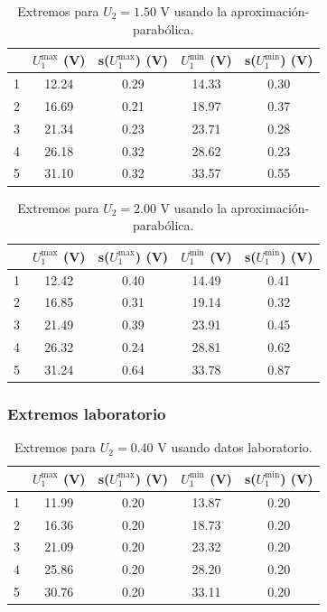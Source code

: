 \documentclass[12pt,a4paper]{article}
\numberwithin{equation}{section}
\numberwithin{figure}{section}
\begin{document}
 
\begin{table}[h!] 	 \centering 
\begin{tabular}{ccccc}
\hline & $U_1^{\max}$ (V) & s($U_1^{\max}$) (V) & $U_1^{\min}$ (V) & s($U_1^{\min}$) (V) \\
\hline
 1 & 12.24 & 0.29 & 14.33 & 0.30 \\
 2 & 16.69 & 0.21 & 18.97 & 0.37 \\
 3 & 21.34 & 0.23 & 23.71 & 0.28 \\
 4 & 26.18 & 0.32 & 28.62 & 0.23 \\
 5 & 31.10 & 0.32 & 33.57 & 0.55 \\
\hline
\end{tabular}\caption{Extremos para $U_2=1.50$ V usando la aproximación-parabólica.} 
\label{Tab:parabolas-5} 
\end{table} 
 
 
\begin{table}[h!] 	 \centering 
\begin{tabular}{ccccc}
\hline & $U_1^{\max}$ (V) & s($U_1^{\max}$) (V) & $U_1^{\min}$ (V) & s($U_1^{\min}$) (V) \\
\hline
 1 & 12.42 & 0.40 & 14.49 & 0.41 \\
 2 & 16.85 & 0.31 & 19.14 & 0.32 \\
 3 & 21.49 & 0.39 & 23.91 & 0.45 \\
 4 & 26.32 & 0.24 & 28.81 & 0.62 \\
 5 & 31.24 & 0.64 & 33.78 & 0.87 \\
\hline
\end{tabular}\caption{Extremos para $U_2=2.00$ V usando la aproximación-parabólica.} 
\label{Tab:parabolas-6} 
\end{table} 


\subsubsection{Extremos laboratorio} \label{Subsubsec:6.1.2}
 
 \begin{table}[h!] 	 \centering 
\begin{tabular}{ccccc}
\hline & $U_1^{\max}$ (V) & s($U_1^{\max}$) (V) & $U_1^{\min}$ (V) & s($U_1^{\min}$) (V) \\
\hline
 1 & 11.99 & 0.20 & 13.87 & 0.20 \\
 2 & 16.36 & 0.20 & 18.73 & 0.20 \\
 3 & 21.09 & 0.20 & 23.32 & 0.20 \\
 4 & 25.86 & 0.20 & 28.20 & 0.20 \\
 5 & 30.76 & 0.20 & 33.11 & 0.20 \\
\hline
\end{tabular}\caption{Extremos para $U_2=0.40$ V usando datos laboratorio.} 
\label{Tab:lab-1} 
\end{table} 
\newpage
 
\end{document}
